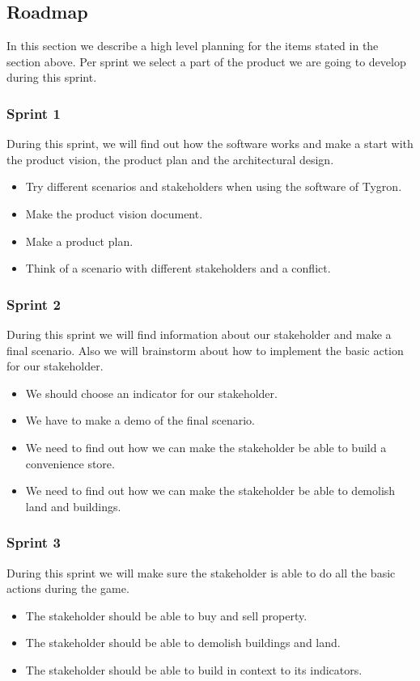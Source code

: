 \subsection{Roadmap}
In this section we describe a high level planning for the items stated in the section above. Per sprint we select a part of the product we are going to develop during this sprint. \newline

\subsubsection{Sprint 1}
During this sprint, we will find out how the software works and make a start with the product vision, the product plan and the architectural design.
\begin{itemize}
	\item Try different scenarios and stakeholders when using the software of Tygron.
	\item Make the product vision document.
	\item Make a product plan.
	\item Think of a scenario with different stakeholders and a conflict.
\end{itemize}

\subsubsection{Sprint 2}
During this sprint we will find information about our stakeholder and make a final scenario. Also we will brainstorm about how to implement the basic action for our stakeholder.
\begin{itemize}
	\item We should choose an indicator for our stakeholder.
	\item We have to make a demo of the final scenario.
	\item We need to find out how we can make the stakeholder be able to build a convenience store.
	\item We need to find out how we can make the stakeholder be able to  demolish land and buildings.
\end{itemize}

\subsubsection{Sprint 3}
During this sprint we will make sure the stakeholder is able to do all the basic actions during the game.
\begin{itemize}
	\item The stakeholder should be able to buy and sell property.
	\item The stakeholder should be able to demolish buildings and land.
	\item The stakeholder should be able to build in context to its indicators.
\end{itemize}

